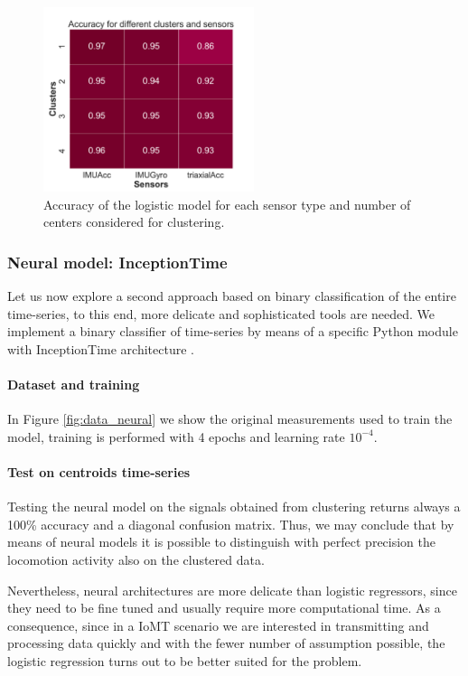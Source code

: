 \documentclass[10pt, a4paper, twocolumn]{article}
\theoremstyle{definition}
\begin{document}
\begin{figure} [h]
         \includegraphics[width=0.55\textwidth]{../clustering/clustering_results_euclidean/accuracy_clusters.pdf}
    \caption{Accuracy of the logistic model for each sensor type and number of centers considered for clustering.  }\label{fig:logistic_clusters}
\end{figure}


\subsubsection{Neural model: InceptionTime }
Let us now explore a second approach based on binary classification of the entire time-series, to this end, more delicate and sophisticated tools are needed. We implement a binary classifier of time-series by means of a specific Python module \cite{tsai} with InceptionTime architecture \cite{Ismail_Fawaz_2020}.
\paragraph{Dataset and training} In Figure \ref{fig:data_neural} we show the original measurements used to train the model, training is performed with 4 epochs and learning rate $10^{-4}$.

\paragraph{Test on centroids time-series} Testing the neural model on the signals obtained from clustering returns always a 100\% accuracy and a diagonal confusion matrix. Thus, we may conclude that by means of neural models it is possible to distinguish with perfect precision the locomotion activity also on the clustered data. \par
Nevertheless, neural architectures are more delicate than logistic regressors, since they need to be fine tuned and usually require more computational time. As a consequence, since in a IoMT scenario we are interested in transmitting and processing data quickly and with the fewer number of assumption possible, the logistic regression turns out to be better suited for the problem.
\end{document}
